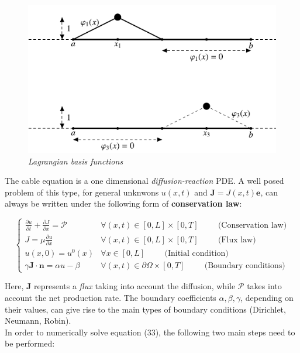 \documentclass[a4paper]{article}
\begin{document}
\begin{figure}[H]
	\begin{center}
		
		\includegraphics[scale=0.7]{basis.png} 
	\end{center} 
	\caption{\textit{Lagrangian basis functions}}
	
\end{figure}


The cable equation is a one dimensional \textit{diffusion-reaction} PDE. A well posed problem of this type, for  general unknwons $ u(x,t)$ and $\textbf{J} = J(x,t)\textbf{e}$, can always be written under the following form of \textbf{conservation law}:


\begin{equation}
\begin{cases}
\frac{\partial u}{\partial t} +\frac{\partial J}{\partial x} = \mathcal{P} & \forall (x,t) \in [0,L] \times [0,T] \hspace{1cm} \text{(Conservation law)} \\
J = \mu \frac{\partial u}{\partial x} & \forall (x,t) \in [0,L] \times [0,T] \hspace{1cm} \text{(Flux law)}\\
u(x,0) = u^0(x) & \forall x \in [0,L] \hspace{1cm}  \text{(Initial condition)} \\
\gamma \textbf{J} \cdot \textbf{n} = \alpha u - \beta &  \forall (x,t) \in \partial \Omega \times [0,T] \hspace{1cm} \text{(Boundary conditions)}
\end{cases}
\end{equation}

Here, $\textbf{J}$  represents a \textit{flux} taking into account the diffusion, while $\mathcal{P}$ takes into account the  net production rate. The boundary coefficients $\alpha, \beta, \gamma$, depending on their values, can give rise to the main types of boundary conditions (Dirichlet, Neumann, Robin).\\
In order to numerically solve equation (33), the following two main steps need to be performed:
\end{document}
